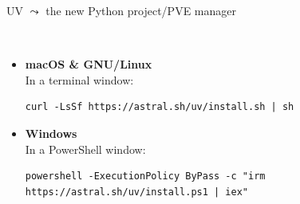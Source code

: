 \documentclass[11pt, serif, mathserif, compress]{beamer}  %
\begin{document}
\begin{frame}[fragile]{UV $\leadsto$ the new Python project/PVE manager}
  
  \begin {bclogo}[noborder=true, couleur=gray!20, couleurBarre=Chocolate, logo=\raisebox{1mm}{\,\huge⚙}, marge=0,margeG=-0.5, margeD=-0.5,]
    {\ }
    \bigskip
    \begin{itemize}\setlength\itemsep{3mm}
    \item {\bf macOS \& GNU/Linux}\\
      \smallskip
      {\small In a terminal window:}
      \begin{verbatim}
curl -LsSf https://astral.sh/uv/install.sh | sh
      \end{verbatim}
    \item {\bf Windows}\\
      \smallskip
       {\small In a PowerShell window:}
      \begin{verbatim}
powershell -ExecutionPolicy ByPass -c "irm https://astral.sh/uv/install.ps1 | iex"
      \end{verbatim}
      
    \end{itemize}
    
  \end{bclogo}
  
\end{frame}
\end{document}
